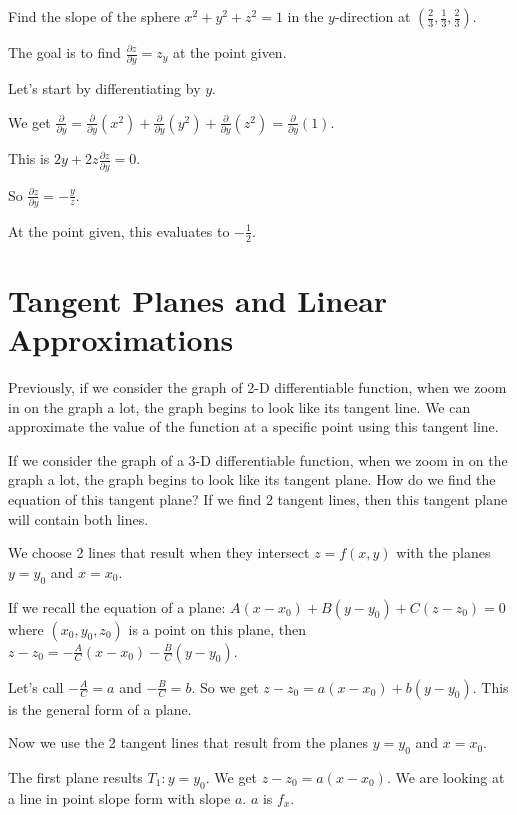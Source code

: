 \documentclass[../calc3.tex]{subfiles}
\begin{document}
\begin{example}
    Find the slope of the sphere $x^2+y^2+z^2 = 1$ in the $y$-direction at $\left(\frac{2}{3},\frac{1}{3},\frac{2}{3}\right)$.

    The goal is to find $\frac{\partial z}{\partial y}=z_y$ at the point given.

    Let's start by differentiating by $y$.

    We get $\frac{\partial}{\partial y}=\frac{\partial}{\partial y}(x^2)+\frac{\partial}{\partial y}(y^2)+\frac{\partial}{\partial y}(z^2)=\frac{\partial}{\partial y}(1)$.

    This is $2y+2z\frac{\partial z}{\partial y}=0$.

    So $\frac{\partial z}{\partial y}=-\frac{y}{z}$.

    At the point given, this evaluates to $-\frac{1}{2}$.
\end{example}

\section{Tangent Planes and Linear Approximations}
Previously, if we consider the graph of 2-D differentiable function, when we zoom in on the graph a lot, the graph begins to look like its tangent line. We can approximate the value of the function at a specific point using this tangent line.

If we consider the graph of a 3-D differentiable function, when we zoom in on the graph a lot, the graph begins to look like its tangent plane.
How do we find the equation of this tangent plane? If we find 2 tangent lines, then this tangent plane will contain both lines.

We choose 2 lines that result when they intersect $z=f(x,y)$ with the planes $y=y_0$ and $x=x_0$.

If we recall the equation of a plane: $A(x-x_0)+B(y-y_0)+C(z-z_0)=0$ where $(x_0,y_0,z_0)$ is a point on this plane, then $z-z_0=-\frac{A}{C}(x-x_0)-\frac{B}{C}(y-y_0)$.

Let's call $-\frac{A}{C}=a$ and $-\frac{B}{C}=b$. So we get $z-z_0=a(x-x_0)+b(y-y_0)$. This is the general form of a plane.

Now we use the 2 tangent lines that result from the planes $y=y_0$ and $x=x_0$.

The first plane results $T_1: y=y_0$. We get $z-z_0=a(x-x_0)$. We are looking at a line in point slope form with slope $a$. $a$ is $f_x$.
\end{document}
